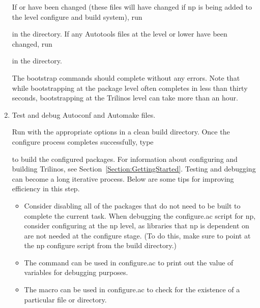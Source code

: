 \documentclass[12pt,relax]{TrilinosDevGuide}
\begin{document}
\begin{enumerate}
If  or 
 have been changed (these files 
will have changed if np is being added to the  level 
configure and build system), run 


in the  directory.  If any Autotools files at the 
 level or lower have been changed, run 


in the  directory.

The bootstrap commands should complete without any errors.  Note that 
while bootstrapping at the package level often completes in less than thirty 
seconds, bootstrapping at the Trilinos level can take more than an hour.

\item Test and debug Autoconf and Automake files.

Run  with the appropriate options in a clean build 
directory.  Once the configure process completes successfully, type 


to build the configured packages.  For information about configuring and 
building Trilinos, see Section~\ref{Section:GettingStarted}.  Testing and 
debugging can become a long iterative process.  Below are some tips for 
improving efficiency in this step.  

\begin{itemize}

\item Consider disabling all of the packages that do not need to be built to 
complete the current task.  When debugging the configure.ac script for np, 
consider configuring at the np level, as libraries that np is dependent on are 
not needed at the configure stage.  (To do this, make sure to point at the np 
configure script from the build directory.)

\item The  command can be used in configure.ac to 
print out the value of variables for debugging purposes.

\item The  macro can be used in configure.ac to 
check for the existence of a particular file or directory.


\end{itemize}
\end{enumerate}
\end{document}
